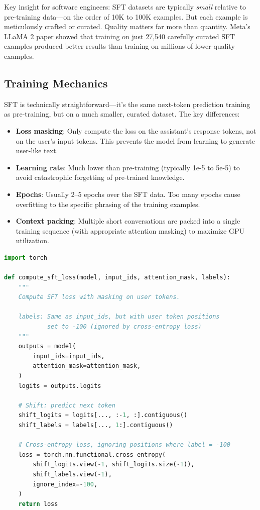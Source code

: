 Key insight for software engineers: SFT datasets are typically \emph{small} relative to pre-training data---on the order of 10K to 100K examples. But each example is meticulously crafted or curated. Quality matters far more than quantity. Meta's LLaMA 2 paper showed that training on just 27,540 carefully curated SFT examples produced better results than training on millions of lower-quality examples.

\subsection{Training Mechanics}

SFT is technically straightforward---it's the same next-token prediction training as pre-training, but on a much smaller, curated dataset. The key differences:

\begin{itemize}[leftmargin=*]
    \item \textbf{Loss masking}: Only compute the loss on the assistant's response tokens, not on the user's input tokens. This prevents the model from learning to generate user-like text.
    \item \textbf{Learning rate}: Much lower than pre-training (typically 1e-5 to 5e-5) to avoid catastrophic forgetting of pre-trained knowledge.
    \item \textbf{Epochs}: Usually 2--5 epochs over the SFT data. Too many epochs cause overfitting to the specific phrasing of the training examples.
    \item \textbf{Context packing}: Multiple short conversations are packed into a single training sequence (with appropriate attention masking) to maximize GPU utilization.
\end{itemize}

\begin{lstlisting}[language=Python, caption={SFT training with loss masking}]
import torch

def compute_sft_loss(model, input_ids, attention_mask, labels):
    """
    Compute SFT loss with masking on user tokens.
    
    labels: Same as input_ids, but with user token positions 
            set to -100 (ignored by cross-entropy loss)
    """
    outputs = model(
        input_ids=input_ids,
        attention_mask=attention_mask,
    )
    logits = outputs.logits
    
    # Shift: predict next token
    shift_logits = logits[..., :-1, :].contiguous()
    shift_labels = labels[..., 1:].contiguous()
    
    # Cross-entropy loss, ignoring positions where label = -100
    loss = torch.nn.functional.cross_entropy(
        shift_logits.view(-1, shift_logits.size(-1)),
        shift_labels.view(-1),
        ignore_index=-100,
    )
    return loss
\end{lstlisting}


